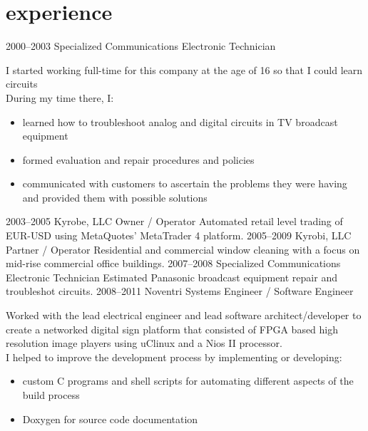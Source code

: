 \section{experience}

\begin{entrylist}
    \entry
        {2000--2003}
        {Specialized Communications}
        {Electronic Technician}
        {
            I started working full-time for this company at the age of 16 so that I could learn circuits\\
            During my time there, I:
            \begin{itemize}
                \item learned how to troubleshoot analog and digital circuits in TV broadcast equipment
                \item formed evaluation and repair procedures and policies
                \item communicated with customers to ascertain the problems they were having and
                      provided them with possible solutions
            \end{itemize}
        }
    \entry
        {2003--2005}
        {Kyrobe, LLC}
        {Owner / Operator}
        {
            Automated retail level trading of EUR-USD using MetaQuotes' MetaTrader 4 platform.
        }
    \entry
        {2005--2009}
        {Kyrobi, LLC}
        {Partner / Operator}
        {
            Residential and commercial window cleaning with a focus on mid-rise commercial
            office buildings.
        }
    \entry
        {2007--2008}
        {Specialized Communications}
        {Electronic Technician}
        {
            Estimated Panasonic broadcast equipment repair and troubleshot circuits.
        }
    \entry
        {2008--2011}
        {Noventri}
        {Systems Engineer / Software Engineer}
        {
            Worked with the lead electrical engineer and lead software architect/developer to
            create a networked digital sign platform that consisted of FPGA based
            high resolution image players using uClinux and a Nios II processor.\\
            I helped to improve the development process by implementing or developing:
            \begin{itemize}
                \item custom C programs and shell scripts for automating different aspects of the build process
                \item Doxygen for source code documentation

\end{itemize}}
\end{entrylist}
